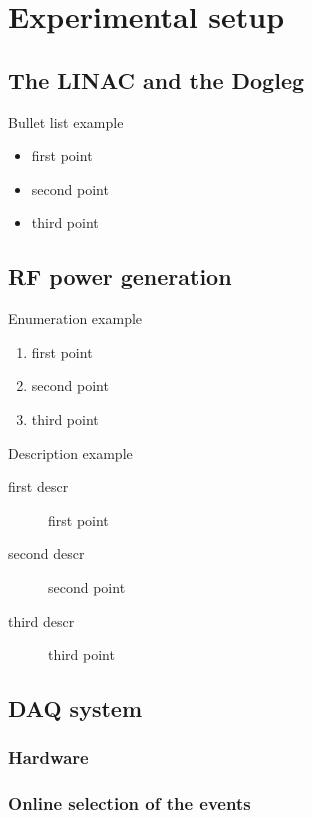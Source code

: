 \chapter[Experimental setup]{Experimental setup}


\section[Linac and dogleg]{The LINAC and the Dogleg}

Bullet list example
\begin{itemize}
\item first point
\item second point
\item third point \\
\end{itemize}

\section[RF power generation]{RF power generation}

\noindent
Enumeration example
\begin{enumerate}
\item first point
\item second point
\item third point\\
\end{enumerate}

\noindent
Description example
\begin{description}
\item[first descr] first point
\item[second descr]  second point
\item[third descr]  third point\\
\end{description}

\section[DAQ system]{DAQ system}

\subsection[Hardware]{Hardware}

\subsection[Online selection of the events]{Online selection of the events}

